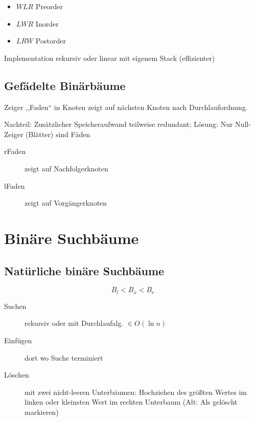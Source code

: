 \begin{itemize}
  \item $WLR$ Preorder
  \item $LWR$ Inorder
  \item $LRW$ Postorder
\end{itemize}

Implementation rekursiv oder linear mit eigenem Stack (effizienter)

\subsection{Gefädelte Binärbäume}

Zeiger ,,Faden`` in Knoten zeigt auf nächsten Knoten nach Durchlaufordnung.

Nachteil: Zusätzlicher Speicheraufwand teilweise redundant; Lösung: Nur Null-Zeiger (Blätter) sind Fäden

\begin{description}
  \item[rFaden] zeigt auf Nachfolgerknoten
  \item[lFaden] zeigt auf Vorgängerknoten
\end{description}

\section{Binäre Suchbäume}

\subsection{Natürliche binäre Suchbäume}

$$B_l < B_x < B_r$$

\begin{description}
  \item [Suchen] rekursiv oder mit Durchlaufalg. $\in O(\ln n)$
  \item [Einfügen] dort wo Suche terminiert
  \item [Löschen] mit zwei nicht-leeren Unterbäumen: Hochziehen des grö\ss ten Wertes im linken oder kleinsten Wert im rechten Unterbaum (Alt: Als gelöscht markieren)
\end{description}


